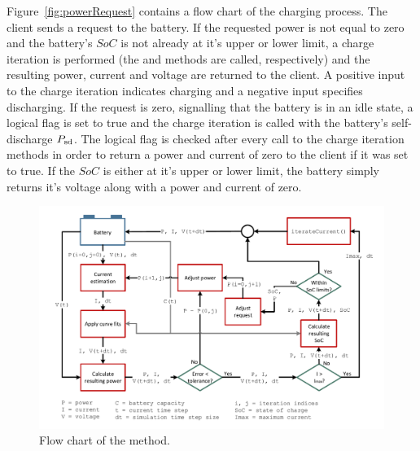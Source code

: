 Figure~\ref{fig:powerRequest} contains a flow chart of the charging process. The client sends a request to the battery. If the requested power is not equal to zero and the battery's $SoC$ is not already at it's upper or lower limit, a charge iteration is performed (the  and  methods are called, respectively) and the resulting power, current and voltage are returned to the client. A positive input to the charge iteration  indicates charging and a negative input specifies discharging. If the request is zero, signalling that the battery is in an idle state, a logical flag is set to true and the charge iteration is called with the battery's self-discharge $P_\text{sd}$. The logical flag is checked after every call to the charge iteration methods in order to return a power and current of zero to the client if it was set to true. If the $SoC$ is either at it's upper or lower limit, the battery simply returns it's voltage along with a power and current of zero.\\
\begin{figure}[t!]
	\captionsetup{type=figure}
	\centering
	\includegraphics[width=\textwidth]{iteratePower.pdf}
	\caption[Flow chart of the  method]{Flow chart of the  method.}
	\label{fig:iteratePower}
\end{figure}

